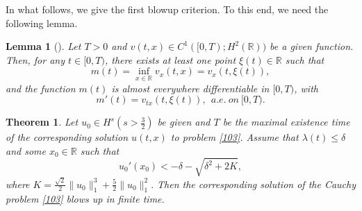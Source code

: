 \documentclass[preprint,12pt]{elsarticle}
\numberwithin{equation}{section}
\newtheorem{theorem}{Theorem}[section]
\newtheorem{lemma}{Lemma}[section]
\begin{document}
In what follows, we give the first blowup criterion. To this end, we need the following lemma.
\begin{lemma}[\cite{Constantin1998}]
\label{lem205} Let $T>0$ and $v(t,x)\in C^{1}([0,T);H^{2}(\mathbb{R}))$ be a given function. Then, for any $t\in[0,T)$, there exists at least one point $\xi(t)\in\mathbb{R}$ such that
\begin{equation*}
m(t)=\inf_{x\in \mathbb{R}}v_{x}(t,x)=v_{x}(t,\xi(t)),
\end{equation*}
and the function $m(t)$ is almost everywhere differentiable in $[0,T)$, with
\begin{equation*}
m'(t)=v_{tx}(t,\xi(t)),\ \ a.e.\ on\ [0,T).
\end{equation*}
\end{lemma}
\begin{theorem}
\label{the205} Let $u_{0}\in H^{s} (s>\frac{3}{2})$ be given and $T$
be the maximal existence time of the corresponding solution $u(t,x)$ to problem \eqref{103}.
Assume that $\lambda(t)\leq \delta$ and some $x_{0}\in \mathbb{R}$ such that
\begin{equation}
u_{0}'(x_{0})<-\delta-\sqrt{\delta^{2}+2K},
\label{2015}
\end{equation}
where $K=\frac{\sqrt{2}}{2}\|u_{0}\|^{3}_{1}+\frac{5}{2}\|u_{0}\|^{2}_{1}.$ Then the corresponding solution of the Cauchy problem \eqref{103} blows up in finite time.
\end{theorem}
\end{document}
